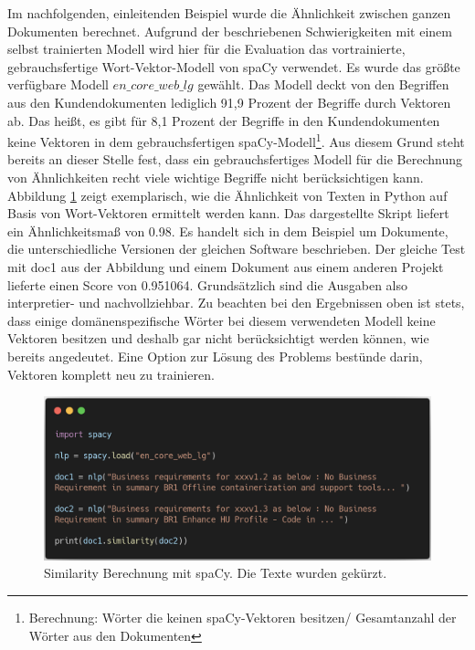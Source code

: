 Im nachfolgenden, einleitenden Beispiel wurde die Ähnlichkeit zwischen ganzen Dokumenten berechnet. 
Aufgrund der beschriebenen Schwierigkeiten mit einem selbst trainierten Modell wird hier für die Evaluation das vortrainierte, gebrauchsfertige Wort-Vektor-Modell von spaCy verwendet. Es wurde das größte verfügbare Modell \(en\_core\_web\_lg\) gewählt. Das Modell deckt von den Begriffen aus den Kundendokumenten lediglich 91,9 Prozent der Begriffe durch Vektoren ab. Das heißt, es gibt für 8,1 Prozent der Begriffe in den Kundendokumenten keine Vektoren in dem gebrauchsfertigen spaCy-Modell\footnote{Berechnung: Wörter die keinen spaCy-Vektoren besitzen/ Gesamtanzahl der Wörter aus den Dokumenten}. Aus diesem Grund steht bereits an dieser Stelle fest, dass ein gebrauchsfertiges Modell für die Berechnung von Ähnlichkeiten recht viele wichtige Begriffe nicht berücksichtigen kann. Abbildung \ref{Abbildung:listing_1} zeigt exemplarisch, wie die Ähnlichkeit von Texten in Python auf Basis von Wort-Vektoren ermittelt werden kann. Das dargestellte Skript liefert ein Ähnlichkeitsmaß von 0.98. Es handelt sich in dem Beispiel um Dokumente, die unterschiedliche Versionen der gleichen Software beschrieben. Der gleiche Test mit doc1 aus der Abbildung und einem Dokument aus einem anderen Projekt lieferte einen Score von 0.951064. Grundsätzlich sind die Ausgaben also interpretier- und nachvollziehbar. Zu beachten bei den Ergebnissen oben ist stets, dass einige domänenspezifische Wörter bei diesem verwendeten Modell keine Vektoren besitzen und deshalb gar nicht berücksichtigt werden können, wie bereits angedeutet. Eine Option zur Lösung des Problems bestünde darin, Vektoren komplett neu zu trainieren. 

\begin{figure}[h]
\centering
\includegraphics[scale=0.35]{content/pics/Listing_1_.png}
\caption{Similarity Berechnung mit spaCy. Die Texte wurden gekürzt.}
\label{Abbildung:listing_1}
\end{figure}

